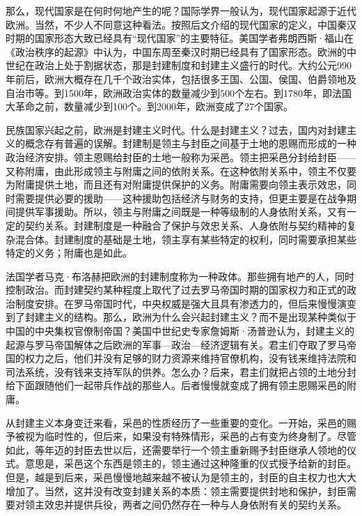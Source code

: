 
那么，现代国家是在何时何地产生的呢？国际学界一般认为，现代国家起源于近代欧洲。当然，不少人不同意这种看法。按照后文介绍的现代国家的定义，中国秦汉时期的国家形态大致已经具有“现代国家”的主要特征。美国学者弗朗西斯·福山在《政治秩序的起源》中认为，中国东周至秦汉时期已经具有了国家形态。欧洲的中世纪在政治上处于割据状态，那是封建制度和封建主义盛行的时代。大约公元990年前后，欧洲大概存在几千个政治实体，包括很多王国、公国、侯国、伯爵领地及自治市等。到1500年，欧洲政治实体的数量减少到500个左右。到1780年，即法国大革命之前，数量减少到100个。到2000年，欧洲变成了27个国家。

民族国家兴起之前，欧洲是封建主义时代。什么是封建主义？过去，国内对封建主义的概念存有普遍的误解。封建制是领主与封臣之间基于土地的恩赐而形成的一种政治经济安排。领主恩赐给封臣的土地一般称为采邑。领主把采邑分封给封臣——又称附庸，由此形成领主与附庸之间的依附关系。在这种依附关系中，领主不仅要为附庸提供土地，而且还有对附庸提供保护的义务。附庸需要向领主表示效忠，同时需要提供必要的援助——这种援助包括经济与财务的支持，但更主要是在战争期间提供军事援助。所以，领主与附庸之间既是一种等级制的人身依附关系，又有一定的契约关系。封建制度是一种融合了保护与效忠关系、人身依附与契约精神的复杂混合体。封建制度的基础是土地，领主享有某些特定的权利，同时需要承担某些特定的义务；附庸也是如此。

法国学者马克·布洛赫把欧洲的封建制度称为一种政体。那些拥有地产的人，同时控制政治。而封建契约某种程度上取代了过去罗马帝国时期的国家权力和正式的政治制度安排。在罗马帝国时代，中央权威是强大且具有渗透力的，但后来慢慢演变到了封建主义的结构。那么，欧洲为什么会兴起封建主义？而不是出现某种类似于中国的中央集权官僚制帝国？美国中世纪史专家詹姆斯·汤普逊认为，封建主义的起源与罗马帝国解体之后欧洲的军事—政治—经济逻辑有关。君主们夺取了罗马帝国的权力之后，他们并没有足够的财力资源来维持官僚机构，没有钱来维持法院和司法系统，没有钱来支持军队的供养。怎么办？后来，君主们就把占领的土地分封给下面跟随他们一起带兵作战的那些人。后者慢慢就变成了拥有领主恩赐采邑的附庸。

从封建主义本身变迁来看，采邑的性质经历了一些重要的变化。一开始，采邑的赐予被视为临时性的，但后来，如果没有特殊情形，采邑的占有变为终身制了。尽管如此，等年迈的封臣去世以后，还需要举行一个领主重新赐予封臣继承人领地的仪式。意思是，采邑这个东西是领主的，领主通过这种隆重的仪式授予给新的封臣。但是，越是到后来，采邑慢慢地越来越不被认为是领主的，封臣的自主权力也大大增加了。当然，这并没有改变封建关系的本质：领主需要提供封地和保护，封臣需要对领主效忠并提供兵役，两者之间仍然存在一种与人身依附有关的契约关系。

